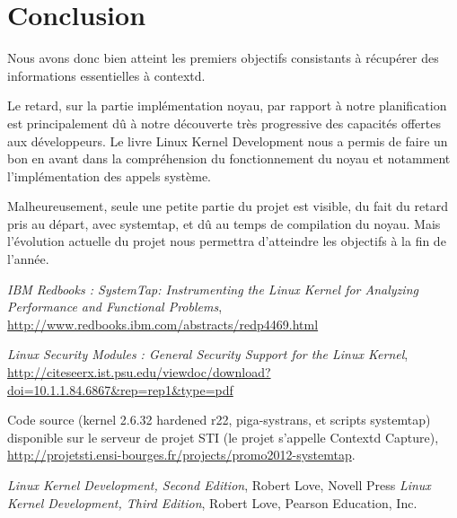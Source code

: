 \section*{Conclusion} 

Nous avons donc bien atteint les premiers objectifs consistants à récupérer des informations essentielles à contextd.

Le retard, sur la partie implémentation noyau, par rapport à notre planification est principalement dû à notre découverte très progressive des capacités offertes aux développeurs. Le livre Linux Kernel Development \cite{LKDSE} nous a permis de faire un bon en avant dans la compréhension du fonctionnement du noyau et notamment l'implémentation des appels système.

Malheureusement, seule une petite partie du projet est visible, du fait du retard pris au départ, avec systemtap, et dû au temps de compilation du noyau. Mais l'évolution actuelle du projet nous permettra d'atteindre les objectifs à la fin de l'année.

\newpage
{}

\begin{thebibliography}{40}
 \textit{IBM Redbooks : SystemTap: Instrumenting the Linux Kernel for Analyzing Performance and Functional Problems}, \url{http://www.redbooks.ibm.com/abstracts/redp4469.html}

 \textit{Linux Security Modules : General Security Support for the Linux Kernel}, \url{http://citeseerx.ist.psu.edu/viewdoc/download?doi=10.1.1.84.6867&rep=rep1&type=pdf}

 Code source (kernel 2.6.32 hardened r22, piga-systrans, et scripts systemtap) disponible sur le serveur de projet STI (le projet s'appelle Contextd Capture), \url{http://projetsti.ensi-bourges.fr/projects/promo2012-systemtap}.

 \textit{Linux Kernel Development, Second Edition}, Robert Love, Novell Press
 \textit{Linux Kernel Development, Third Edition}, Robert Love, Pearson Education, Inc.
\end{thebibliography}

